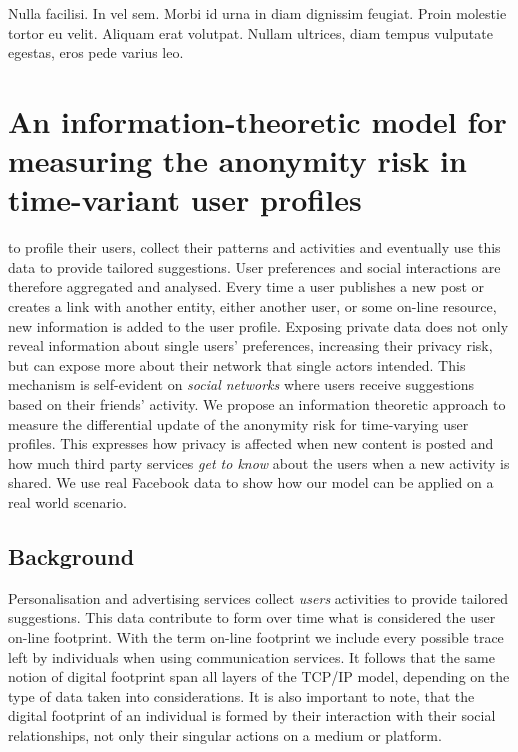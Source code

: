 \begin{savequote}[75mm] 
Nulla facilisi. In vel sem. Morbi id urna in diam dignissim feugiat. Proin molestie tortor eu velit. Aliquam erat volutpat. Nullam ultrices, diam tempus vulputate egestas, eros pede varius leo.
\end{savequote}

\chapter{An information-theoretic model for measuring the anonymity risk in time-variant user profiles}

 to profile their users, collect their patterns and activities and eventually use this data to provide tailored suggestions. User preferences and social interactions are therefore aggregated and analysed. Every time a user publishes a new post or creates a link with another entity, either another user, or some on-line resource, new information is added to the user profile. Exposing private data does not only reveal information about single users' preferences, increasing their privacy risk, but can expose more about their network that single actors intended. This mechanism is self-evident on \emph{social networks} where users receive suggestions based on their friends' activity.
We propose an information theoretic approach to measure the differential update of the anonymity risk for time-varying user profiles. This expresses how privacy is affected when new content is posted and how much third party services \emph{get to know} about the users when a new activity is shared. We use real Facebook data to show how our model can be applied on a real world scenario.

\section{Background}

Personalisation and advertising services collect \emph{users} activities to provide tailored suggestions. This data contribute to form over time what is considered the user on-line footprint. With the term on-line footprint we include every possible trace left by individuals when using communication services. It follows that the same notion of digital footprint span all layers of the TCP/IP model, depending on the type of data taken into considerations. It is also important to note, that the digital footprint of an individual is formed by their interaction with their social relationships, not only their singular actions on a medium or platform. 

